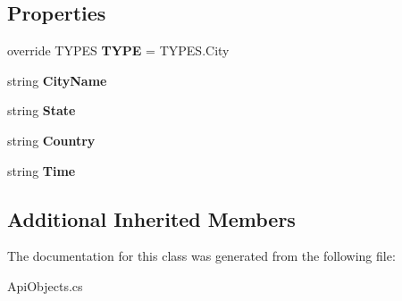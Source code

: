 \subsection*{Properties}
\begin{DoxyCompactItemize}
\item 
\mbox{\label{class_golf_now_a_p_i_1_1_tees_by_city_args_ae3e01a7e6e68110be3feecbb41c20dc2}} 
override T\+Y\+P\+ES {\bfseries T\+Y\+PE} = T\+Y\+P\+E\+S.\+City
\item 
\mbox{\label{class_golf_now_a_p_i_1_1_tees_by_city_args_abd0267bb70a1aad05a2dad16444e55ab}} 
string {\bfseries City\+Name}
\item 
\mbox{\label{class_golf_now_a_p_i_1_1_tees_by_city_args_a10d828ad9a2cff81e752603339e59d39}} 
string {\bfseries State}
\item 
\mbox{\label{class_golf_now_a_p_i_1_1_tees_by_city_args_a0ef7c494c26af12c2f8952a01ed7d138}} 
string {\bfseries Country}
\item 
\mbox{\label{class_golf_now_a_p_i_1_1_tees_by_city_args_a25e749f3b30e7d3da98371a99d3b1a87}} 
string {\bfseries Time}
\end{DoxyCompactItemize}
\subsection*{Additional Inherited Members}


The documentation for this class was generated from the following file\+:\begin{DoxyCompactItemize}
\item 
Api\+Objects.\+cs\end{DoxyCompactItemize}
